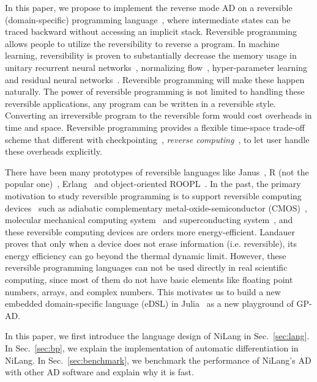 \documentclass{article}
\newcommand{\<}{\langle}
\renewcommand{\>}{\rangle}
\newcommand{\Sec}[1]{Sec.~\ref{#1}}
\theoremstyle{definition}\newtheorem{definition}{\textit{Definition}}
\begin{document}
In this paper, we propose to implement the reverse mode AD on a reversible (domain-specific) programming language~\cite{Perumalla2013,Frank2017}, where intermediate states can be traced backward without accessing an implicit stack.
Reversible programming allows people to utilize the reversibility to reverse a program.
In machine learning, reversibility is proven to substantially decrease the memory usage in unitary recurrent neural networks~\cite{MacKay2018}, normalizing flow~\cite{Dinh2014}, hyper-parameter learning~\cite{Maclaurin2015} and residual neural networks~\cite{Gomez2017, Behrmann2018}.
Reversible programming will make these happen naturally.
The power of reversible programming is not limited to handling these reversible applications, any program can be written in a reversible style.
Converting an irreversible program to the reversible form would cost overheads in time and space.
Reversible programming provides a flexible time-space trade-off scheme that different with checkpointing~\cite{Griewank1992}, \textit{reverse computing}~\cite{Bennett1989,Levine1990}, to let user handle these overheads explicitly.

There have been many prototypes of reversible languages like Janus~\cite{Lutz1986}, R (not the popular one)~\cite{Frank1997}, Erlang~\cite{Lanese2018} and object-oriented ROOPL~\cite{Haulund2017}.
In the past, the primary motivation to study reversible programming is to support reversible computing devices~\cite{Frank1999} such as adiabatic complementary metal-oxide-semiconductor (CMOS)~\cite{Koller1992}, molecular mechanical computing system~\cite{Merkle2018} and superconducting system~\cite{Likharev1977,Semenov2003,Takeuchi2014,Takeuchi2017}, and these reversible computing devices are orders more energy-efficient. Landauer~\cite{Landauer1961} proves that only when a device does not erase information (i.e. reversible), its energy efficiency can go beyond the thermal dynamic limit.
However, these reversible programming languages can not be used directly in real scientific computing, since most of them do not have basic elements like floating point numbers, arrays, and complex numbers. This motivates us to build a new embedded domain-specific language (eDSL) in Julia~\cite{Bezanson2012,Bezanson2017} as a new playground of GP-AD.

    In this paper, we first introduce the language design of NiLang in \Sec{sec:lang}.
    In \Sec{sec:bp}, we explain the implementation of automatic differentiation in NiLang.
    In \Sec{sec:benchmark}, we benchmark the performance of NiLang's AD with other AD software and explain why it is fast.
\end{document}
